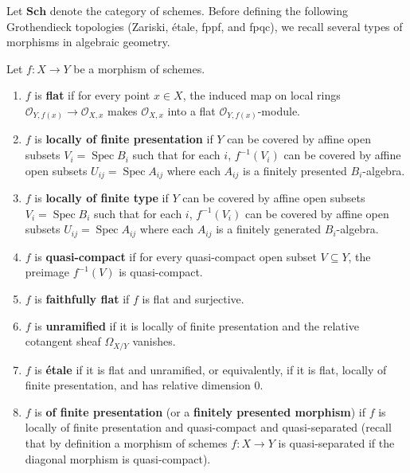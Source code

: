 \documentclass[12pt]{article}
\begin{document}
Let $\mathbf{Sch}$ denote the category of schemes. Before defining the following Grothendieck topologies (Zariski, étale, fppf, and fpqc), we recall several types of morphisms in algebraic geometry.

\begin{definition}
    Let $f: X \to Y$ be a morphism of schemes.
    \begin{enumerate}
        \item $f$ is \textbf{flat} if for every point $x \in X$, the induced map on local rings $\mathcal{O}_{Y,f(x)} \to \mathcal{O}_{X,x}$ makes $\mathcal{O}_{X,x}$ into a flat $\mathcal{O}_{Y,f(x)}$-module.

        \item $f$ is \textbf{locally of finite presentation} if $Y$ can be covered by affine open subsets $V_i = \operatorname{Spec} B_i$ such that for each $i$, $f^{-1}(V_i)$ can be covered by affine open subsets $U_{ij} = \operatorname{Spec} A_{ij}$ where each $A_{ij}$ is a finitely presented $B_i$-algebra.
        \item $f$ is \textbf{locally of finite type} if $Y$ can be covered by affine open subsets $V_i = \operatorname{Spec} B_i$ such that for each $i$, $f^{-1}(V_i)$ can be covered by affine open subsets $U_{ij} = \operatorname{Spec} A_{ij}$ where each $A_{ij}$ is a finitely generated $B_i$-algebra.

        \item $f$ is \textbf{quasi-compact} if for every quasi-compact open subset $V \subseteq Y$, the preimage $f^{-1}(V)$ is quasi-compact.

        \item $f$ is \textbf{faithfully flat} if $f$ is flat and surjective.

        \item $f$ is \textbf{unramified} if it is locally of finite presentation and the relative cotangent sheaf $\Omega_{X/Y}$ vanishes.

        \item $f$ is \textbf{étale} if it is flat and unramified, or equivalently, if it is flat, locally of finite presentation, and has relative dimension 0.
        \item $f$ is \textbf{of finite presentation} (or a \textbf{finitely presented morphism}) if $f$ is locally of finite presentation and quasi-compact and quasi-separated (recall that by definition a morphism of schemes $f : X \to Y$ is quasi-separated if the diagonal morphism is quasi-compact).
    \end{enumerate}
\end{definition}
\end{document}
